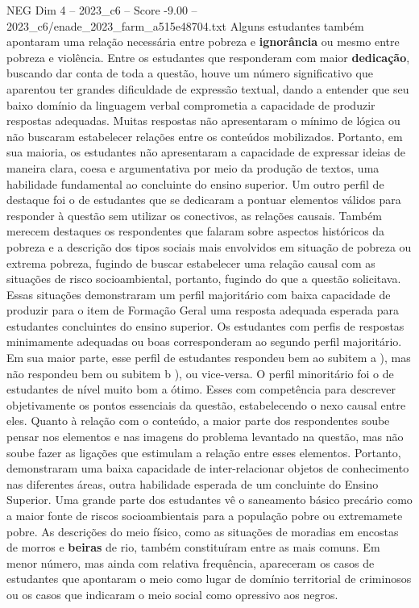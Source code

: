 \begin{textsample}{NEG Dim 4 – 2023\_c6 – Score -9.00 – 2023\_c6/enade\_2023\_farm\_a515e48704.txt}
Alguns estudantes também apontaram uma relação necessária entre pobreza e \textbf{ignorância} ou mesmo entre pobreza e violência.
Entre os estudantes que responderam com maior \textbf{dedicação}, buscando dar conta de toda a questão, houve um número significativo que aparentou ter grandes dificuldade de expressão textual, dando a entender que seu baixo domínio da linguagem verbal comprometia a capacidade de produzir respostas adequadas.
Muitas respostas não apresentaram o mínimo de lógica ou não buscaram estabelecer relações entre os conteúdos mobilizados.
Portanto, em sua maioria, os estudantes não apresentaram a capacidade de expressar ideias de maneira clara, coesa e argumentativa por meio da produção de textos, uma habilidade fundamental ao concluinte do ensino superior.
Um outro perfil de destaque foi o de estudantes que se dedicaram a pontuar elementos válidos para responder à questão sem utilizar os conectivos, as relações causais.
Também merecem destaques os respondentes que falaram sobre aspectos históricos da pobreza e a descrição dos tipos sociais mais envolvidos em situação de pobreza ou extrema pobreza, fugindo de buscar estabelecer uma relação causal com as situações de risco socioambiental, portanto, fugindo do que a questão solicitava.
Essas situações demonstraram um perfil majoritário com baixa capacidade de produzir para o item de Formação Geral uma resposta adequada esperada para estudantes concluintes do ensino superior.
Os estudantes com perfis de respostas minimamente adequadas ou boas corresponderam ao segundo perfil majoritário.
Em sua maior parte, esse perfil de estudantes respondeu bem ao subitem a ), mas não respondeu bem ou subitem b ), ou vice-versa.
O perfil minoritário foi o de estudantes de nível muito bom a ótimo.
Esses com competência para descrever objetivamente os pontos essenciais da questão, estabelecendo o nexo causal entre eles.
Quanto à relação com o conteúdo, a maior parte dos respondentes soube pensar nos elementos e nas imagens do problema levantado na questão, mas não soube fazer as ligações que estimulam a relação entre esses elementos.
Portanto, demonstraram uma baixa capacidade de inter-relacionar objetos de conhecimento nas diferentes áreas, outra habilidade esperada de um concluinte do Ensino Superior.
Uma grande parte dos estudantes vê o saneamento básico precário como a maior fonte de riscos socioambientais para a população pobre ou extremamete pobre.
As descrições do meio físico, como as situações de moradias em encostas de morros e \textbf{beiras} de rio, também constituíram entre as mais comuns.
Em menor número, mas ainda com relativa frequência, apareceram os casos de estudantes que apontaram o meio como lugar de domínio territorial de criminosos ou os casos que indicaram o meio social como opressivo aos negros.

\end{textsample}
